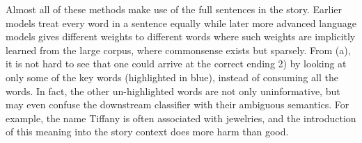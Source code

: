 Almost all of these methods make use of the full sentences in the story. Earlier
models treat every word in a sentence equally while later more advanced language
models gives different weights to different words where such weights are implicitly
learned from the large corpus, where commonsense exists but sparsely. 
From (a), it is not hard to see that one could arrive at the correct
ending 2) by looking at only some of the key words (highlighted in blue), instead of
consuming all the words. In fact, the other un-highlighted words are not only
uninformative, but may even confuse the downstream classifier with their ambiguous
semantics. For example, the name Tiffany is often associated with jewelries, and
the introduction of this meaning into the story context does more harm than good.



